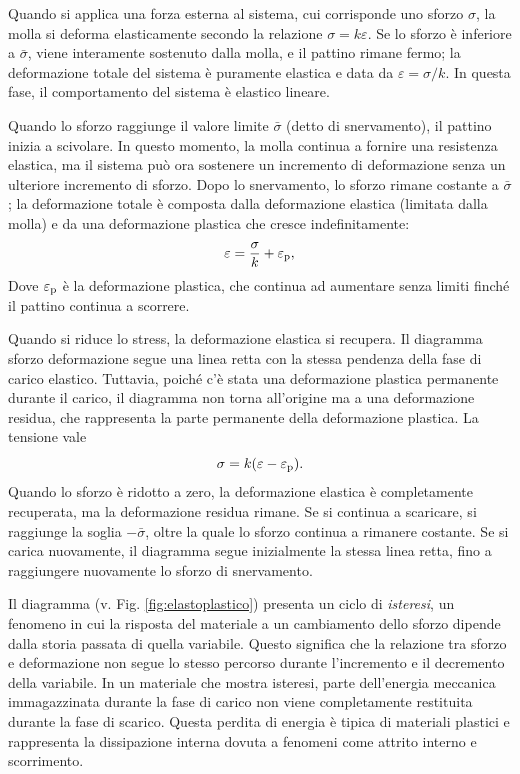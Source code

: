 Quando si applica una forza esterna al sistema, cui corrisponde uno sforzo $\sigma$, la molla si deforma elasticamente secondo la relazione $\sigma=k \varepsilon$. Se lo sforzo  è inferiore a $\bar\sigma$, viene interamente sostenuto dalla molla, e il pattino rimane fermo; la deformazione totale del sistema è puramente elastica e data da $\varepsilon=\sigma/k$. In questa fase, il comportamento del sistema è elastico lineare.

Quando lo sforzo raggiunge il valore limite $\bar{\sigma}$ (detto di snervamento), il pattino inizia a scivolare. In questo momento, la molla continua a fornire una resistenza elastica, ma il sistema può ora sostenere un incremento di deformazione senza un ulteriore incremento di sforzo. Dopo lo snervamento, lo sforzo  rimane costante a $\bar\sigma$; la deformazione totale è composta dalla deformazione elastica (limitata dalla molla) e da una deformazione plastica che cresce indefinitamente:
\begin{equation}
	\varepsilon=\frac{\sigma}{k}+\varepsilon_{\rm p},
\end{equation}
Dove $\varepsilon_{\rm p}$ è la deformazione plastica, che continua ad aumentare senza limiti finché il pattino continua a scorrere.

Quando si riduce lo stress, la deformazione elastica si recupera. Il diagramma sforzo deformazione segue una linea retta con la stessa pendenza della fase di carico elastico. Tuttavia, poiché c'è stata una deformazione plastica permanente durante il carico, il diagramma non torna all'origine ma a una deformazione residua, che rappresenta la parte permanente della deformazione plastica. La tensione vale
\begin{equation}
	\sigma=k(\varepsilon-\varepsilon_{\rm p}).
\end{equation}
Quando lo sforzo è ridotto a zero, la deformazione elastica è completamente recuperata, ma la deformazione residua rimane. Se si continua a scaricare, si raggiunge la soglia $-\bar{\sigma}$, oltre la quale lo sforzo continua a rimanere costante. Se si carica nuovamente, il diagramma segue inizialmente la stessa linea retta, fino a raggiungere nuovamente lo sforzo di snervamento.

Il diagramma (v. Fig. \ref{fig:elastoplastico}) presenta un ciclo di \textit{isteresi}, un fenomeno in cui la risposta del materiale  a un cambiamento dello sforzo dipende dalla storia passata di quella variabile. Questo significa che la relazione tra  sforzo e deformazione non segue lo stesso percorso durante l'incremento e il decremento della variabile. In un materiale che mostra isteresi, parte dell'energia meccanica immagazzinata durante la fase di carico non viene completamente restituita durante la fase di scarico. Questa perdita di energia è tipica di materiali plastici e rappresenta la dissipazione interna dovuta a fenomeni come attrito interno e scorrimento.

